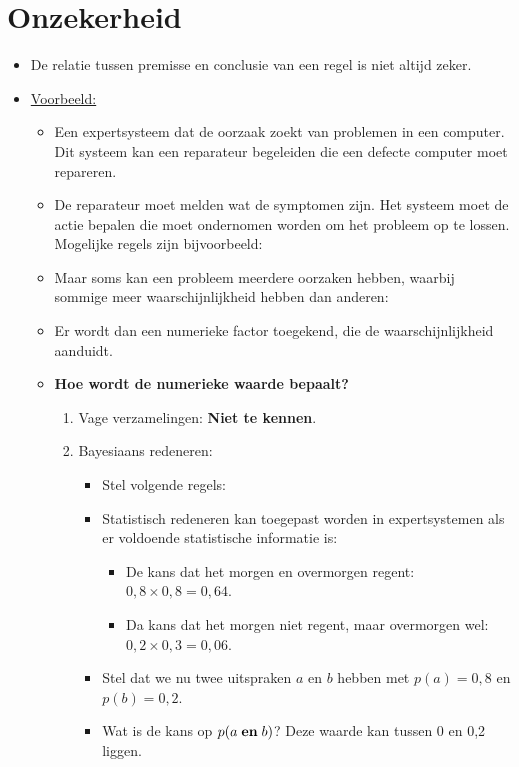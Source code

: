 \section{Onzekerheid}
\begin{itemize}
	\item De relatie tussen premisse en conclusie van een regel is niet altijd zeker.
	\item \underline{Voorbeeld:}
	\begin{itemize}
		\item Een expertsysteem dat de oorzaak zoekt van problemen in een computer. Dit systeem kan een reparateur begeleiden die een defecte computer moet repareren.
		\item De reparateur moet melden wat de symptomen zijn. Het systeem moet de actie bepalen die moet ondernomen worden om het probleem op te lossen. Mogelijke regels zijn bijvoorbeeld:

		
		\item Maar soms kan een probleem meerdere oorzaken hebben, waarbij sommige meer waarschijnlijkheid hebben dan anderen:

		
		\item Er wordt dan een numerieke factor toegekend, die de waarschijnlijkheid aanduidt. 
		
		\item \textbf{Hoe wordt de numerieke waarde bepaalt?}
		\begin{enumerate}
			\item Vage verzamelingen: \textbf{Niet te kennen}.
			\item Bayesiaans redeneren: 
			\begin{itemize}
				\item Stel volgende regels:

				\item Statistisch redeneren kan toegepast worden in expertsystemen als er voldoende statistische informatie is:
				\begin{itemize}
					\item De kans dat het morgen en overmorgen regent: $0,8 \times 0,8 = 0,64$.
					\item Da kans dat het morgen niet regent, maar overmorgen wel: $0,2 \times 0,3 = 0,06$.
				\end{itemize}
				\item Stel dat we nu twee uitspraken $a$ en $b$ hebben met $p(a) = 0,8$ en $p(b) = 0,2$.
				\item Wat is de kans op $p(a\; \hbox{\textbf{en}}\;b)$? Deze waarde kan tussen 0 en 0,2 liggen. 
				

\end{itemize}
\end{enumerate}
\end{itemize}
\end{itemize}
